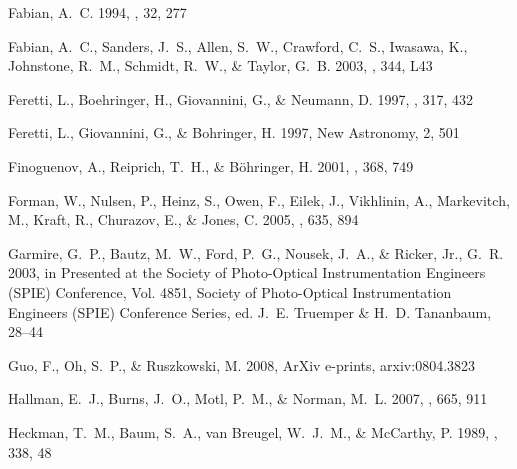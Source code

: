 \documentclass[12pt,preprint]{aastex}
\begin{document}
\begin{thebibliography}{139}
{Fabian}, A.~C. 1994, \araa, 32, 277

{Fabian}, A.~C., {Sanders}, J.~S., {Allen}, S.~W., {Crawford}, C.~S.,
  {Iwasawa}, K., {Johnstone}, R.~M., {Schmidt}, R.~W., \& {Taylor}, G.~B. 2003,
  \mnras, 344, L43

{Feretti}, L., {Boehringer}, H., {Giovannini}, G., \& {Neumann}, D.
  1997{}, \aap, 317, 432

{Feretti}, L., {Giovannini}, G., \& {Bohringer}, H. 1997{}, New
  Astronomy, 2, 501

{Finoguenov}, A., {Reiprich}, T.~H., \& {B{\"o}hringer}, H. 2001, \aap, 368,
  749

{Forman}, W., {Nulsen}, P., {Heinz}, S., {Owen}, F., {Eilek}, J., {Vikhlinin},
  A., {Markevitch}, M., {Kraft}, R., {Churazov}, E., \& {Jones}, C. 2005, \apj,
  635, 894

{Garmire}, G.~P., {Bautz}, M.~W., {Ford}, P.~G., {Nousek}, J.~A., \& {Ricker},
  Jr., G.~R. 2003, in Presented at the Society of Photo-Optical Instrumentation
  Engineers (SPIE) Conference, Vol. 4851, Society of Photo-Optical
  Instrumentation Engineers (SPIE) Conference Series, ed. J.~E. {Truemper} \&
  H.~D. {Tananbaum}, 28--44

{Guo}, F., {Oh}, S.~P., \& {Ruszkowski}, M. 2008, ArXiv e-prints,
  arxiv:0804.3823

{Hallman}, E.~J., {Burns}, J.~O., {Motl}, P.~M., \& {Norman}, M.~L. 2007, \apj,
  665, 911

{Heckman}, T.~M., {Baum}, S.~A., {van Breugel}, W.~J.~M., \& {McCarthy}, P.
  1989, \apj, 338, 48


\end{thebibliography}
\end{document}
